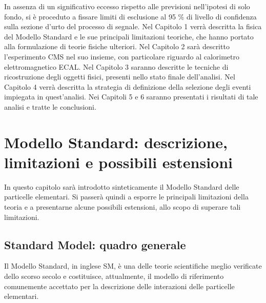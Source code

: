 In assenza di un significativo eccesso rispetto alle previsioni nell'ipotesi di solo fondo, si è proceduto a fissare limiti di esclusione al
95 \% di livello di confidenza sulla sezione d'urto del processo di segnale.
\newline
Nel Capitolo 1 verrà descritta la fisica del Modello Standard e le sue principali limitazioni teoriche, che hanno portato alla formulazione
di teorie fisiche ulteriori.
\newline
Nel Capitolo 2 sarà descritto l'esperimento \acs{CMS} nel suo insieme, con particolare riguardo al calorimetro elettromagnetico \acs{ECAL}.
\newline
Nel Capitolo 3 saranno descritte le tecniche di ricostruzione degli oggetti fisici, presenti nello stato finale dell'analisi.
\newline
Nel Capitolo 4 verrà descritta la strategia di definizione della selezione degli eventi impiegata in quest'analisi. 
\newline
Nei Capitoli 5 e 6 saranno presentati i risultati di tale analisi e tratte le conclusioni.



\chapter{Modello Standard: descrizione, limitazioni e possibili estensioni}
In questo capitolo sarà introdotto sinteticamente il Modello Standard delle particelle elementari.
Si passerà quindi a esporre le principali limitazioni della teoria e a presentarne alcune possibili estensioni,
allo scopo di superare tali limitazioni.
\section{Standard Model: quadro generale}
Il Modello Standard, in inglese \ac{SM}, è una delle teorie scientifiche meglio verificate dello scorso secolo e costituisce, attualmente, 
il modello di riferimento comunemente accettato per la descrizione delle interazioni delle particelle elementari.

